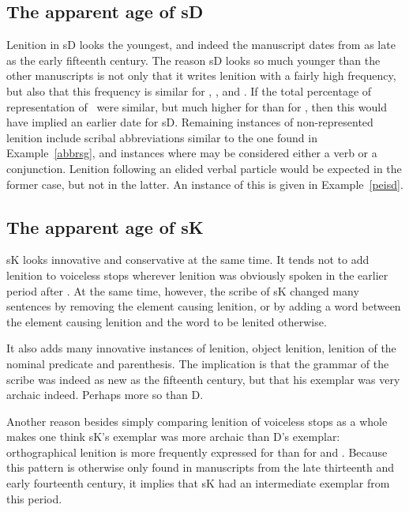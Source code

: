 \subsection{The apparent age of \gls{sD}}
\label{sec:apparent-age-glssd}

Lenition in \gls{sD} looks the youngest, and indeed the manuscript dates from as late as the early fifteenth century. The reason \gls{sD} looks so much younger than the other manuscripts is not only that it writes lenition with a fairly high frequency, but also that this frequency is similar for , , and . If the total percentage of representation of \lT\ were similar, but much higher for  than for , then this would have implied an earlier date for \gls{sD}. Remaining instances of non-represented lenition include scribal abbreviations similar to the one found in  Example~\ref{abbrsg}, and instances where   may be considered either a verb or a conjunction. Lenition following an elided verbal particle  would be expected in the former case, but not in the latter. An instance of this is given in Example~\ref{peisd}.

\subsection{The apparent age of \gls{sK}}
\label{sec:apparent-age-glssk}

\gls{sK} looks innovative and conservative at the same time. It tends not to add lenition to voiceless stops wherever lenition was obviously spoken in the earlier period \eg after . At the same time, however, the scribe of \gls{sK} changed many sentences by removing the element causing lenition, or by adding a word between the element causing lenition and the word to be lenited otherwise.

  It also adds many innovative instances of lenition, \ie object lenition, lenition of the nominal predicate and parenthesis. The implication is that the grammar of the scribe was indeed as new as the fifteenth century, but that his exemplar was very archaic indeed. Perhaps more so than D.

  Another reason besides simply comparing lenition of voiceless stops as a whole makes one think \gls{sK}'s exemplar was more archaic than D's exemplar: orthographical lenition is more frequently expressed for  than for  and . Because this pattern is otherwise only found in manuscripts from the late thirteenth and early fourteenth century, it implies that \gls{sK} had an intermediate exemplar from this period.

